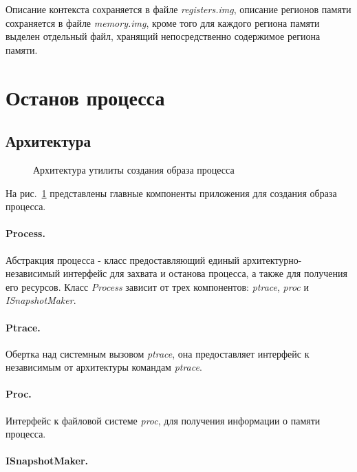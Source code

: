 Описание контекста сохраняется в файле \textit{registers.img}, описание регионов памяти сохраняется в файле \textit{memory.img}, кроме того для каждого региона памяти выделен отдельный файл, хранящий непосредственно содержимое региона памяти.

\section{Останов процесса}

\subsection{Архитектура}

\begin{figure}[h]
\caption{Архитектура утилиты создания образа процесса}
\label{pic:suspend_arch}
\end{figure}

На рис.~\ref{pic:suspend_arch} представлены главные компоненты приложения для создания образа процесса.

\paragraph{Process.}

Абстракция процесса - класс предоставляющий единый архитектурно-независимый интерфейс для захвата и останова процесса, а также для получения его ресурсов. Класс \textit{Process} зависит от трех компонентов: \textit{ptrace}, \textit{proc} и \textit{ISnapshotMaker}.

\paragraph{Ptrace.}

Обертка над системным вызовом \textit{ptrace}, она предоставляет интерфейс к независимым от архитектуры командам \textit{ptrace}.

\paragraph{Proc.}

Интерфейс к файловой системе \textit{proc}, для получения информации о памяти процесса.

\paragraph{ISnapshotMaker.}

